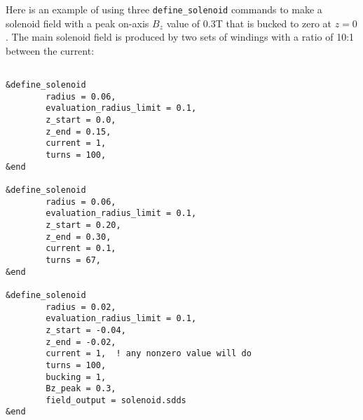 Here is an example of using three {\tt define\_solenoid} commands to make a solenoid field with
a peak on-axis $B_z$ value of 0.3T that is bucked to zero at $z=0$.  The main solenoid field is produced by
two sets of windings with a ratio of 10:1 between the current:
\begin{verbatim}

&define_solenoid
        radius = 0.06,
        evaluation_radius_limit = 0.1,
        z_start = 0.0,
        z_end = 0.15,
        current = 1,
        turns = 100,
&end

&define_solenoid
        radius = 0.06,
        evaluation_radius_limit = 0.1,
        z_start = 0.20,
        z_end = 0.30,
        current = 0.1,
        turns = 67,
&end

&define_solenoid
        radius = 0.02,
        evaluation_radius_limit = 0.1,
        z_start = -0.04,
        z_end = -0.02,
        current = 1,  ! any nonzero value will do
        turns = 100,
        bucking = 1,
        Bz_peak = 0.3,
        field_output = solenoid.sdds
&end
\end{verbatim}
